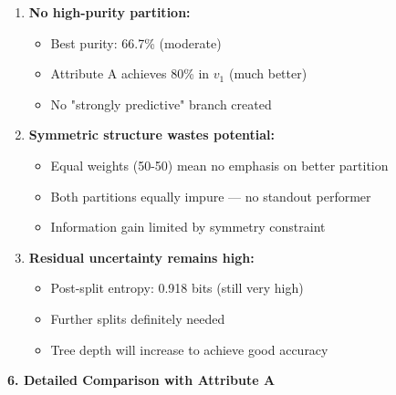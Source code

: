 \documentclass[12pt]{article}
\begin{document}
\begin{explanation}
\begin{enumerate}
    \item \textbf{No high-purity partition:}
    \begin{itemize}
        \item Best purity: 66.7\% (moderate)
        \item Attribute A achieves 80\% in $v_1$ (much better)
        \item No "strongly predictive" branch created
    \end{itemize}

    \item \textbf{Symmetric structure wastes potential:}
    \begin{itemize}
        \item Equal weights (50-50) mean no emphasis on better partition
        \item Both partitions equally impure — no standout performer
        \item Information gain limited by symmetry constraint
    \end{itemize}

    \item \textbf{Residual uncertainty remains high:}
    \begin{itemize}
        \item Post-split entropy: 0.918 bits (still very high)
        \item Further splits definitely needed
        \item Tree depth will increase to achieve good accuracy
    \end{itemize}
\end{enumerate}

\textbf{6. Detailed Comparison with Attribute A}


\end{explanation}
\end{document}
